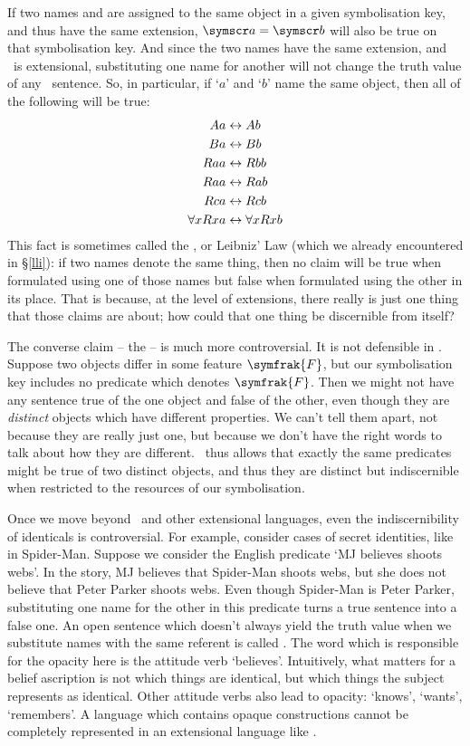 \begin{earg}
If two names  and  are assigned to the same object in a given symbolisation key, and thus have the same extension, $\meta{a}=\meta{b}$ will also be true  on that symbolisation key. And since the two names have the same extension, and \FOL\ is extensional, substituting one name for another will not change the truth value of any \FOL\ sentence. So, in particular, if `$a$' and `$b$' name the same object, then all of the following will be true:\label{model.nonidentity}
	\begin{align*}
	 	Aa &\leftrightarrow Ab \\
	 	Ba &\leftrightarrow Bb\\
		Raa &\leftrightarrow Rbb\\
		Raa & \leftrightarrow Rab\\
		Rca &\leftrightarrow Rcb\\
		\forall x Rxa &\leftrightarrow \forall x Rxb
	\end{align*}
This fact is sometimes called the , or Leibniz' Law (which we already encountered in §\ref{lli}): if two names denote the same thing, then no claim will be true when formulated using one of those names but false when formulated using the other in its place. That is because, at the level of extensions, there really is just one thing that those claims are about; how could that one thing be discernible from itself?

The converse claim – the  – is much more controversial. It is not defensible in \FOL. Suppose two objects differ in some feature $\symfrak{F}$, but our symbolisation key includes no predicate which denotes $\symfrak{F}$. Then we might not have any sentence true of the one object and false of the other, even though they are \emph{distinct} objects which have different properties. We can't tell them apart, not because they are really just one, but because we don't have the right words to talk about how they are different. \FOL\ thus allows that exactly the same predicates might be true of two distinct objects, and thus they are distinct but indiscernible when restricted to the resources of our symbolisation.

Once we move beyond \FOL\ and other extensional languages, even the indiscernibility of identicals is controversial. For example, consider cases of secret identities, like in Spider-Man. Suppose we consider the English predicate `MJ believes \gap{} shoots webs'. In the story, MJ believes that Spider-Man shoots webs, but she does not believe that Peter Parker shoots webs. Even though Spider-Man is Peter Parker, substituting one name for the other in this predicate turns a true sentence into a false one. An open sentence which doesn't always yield the truth value when we substitute names with the same referent is called . The word which is responsible for the opacity here is the attitude verb `believes'. Intuitively, what matters for a belief ascription is not which things are identical, but which things the subject represents as identical. Other attitude verbs also lead to opacity: `knows', `wants', `remembers'. A language which contains opaque constructions cannot be completely represented in an extensional language like \FOL.  



\end{earg}
